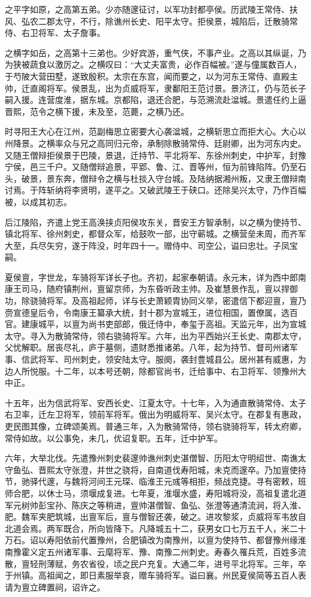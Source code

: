 \documentclass[12pt,UTF8]{ctexbook}
\begin{document}
之平字如原，之高第五弟。少亦随邃征讨，以军功封都亭侯。历武陵王常侍、扶风、弘农二郡太守，不行，除谯州长史、阳平太守。拒侯景，城陷后，迁散骑常侍、右卫将军、太子詹事。

之横字如岳，之高第十三弟也。少好宾游，重气侠，不事产业。之高以其纵诞，乃为狭被蔬食以激厉之。之横叹曰：“大丈夫富贵，必作百幅被。”遂与僮属数百人，于芍陂大营田墅，遂致殷积。太宗在东宫，闻而要之，以为河东王常侍、直殿主帅，迁直阁将军。侯景乱，出为贞威将军，隶鄱阳王范讨景。景济江，仍与范长子嗣入援。连营度淮，据东城。京都陷，退还合肥，与范溯流赴湓城。景遣任约上逼晋熙，范令之横下援，未及至，范薨，之横乃还。

时寻阳王大心在江州，范副梅思立密要大心袭湓城，之横斩思立而拒大心。大心以州降景。之横率众与兄之高同归元帝，承制除散骑常侍、廷尉卿，出为河东内史。又随王僧辩拒侯景于巴陵，景退，迁持节、平北将军、东徐州刺史，中护军，封豫宁侯，邑三千户。又随僧辩追景，平郢、鲁、江、晋等州，恒为前锋陷阵。仍至石头，破景，景东奔，僧辩令之横与杜掞入守台城。及陆纳据湘州叛，又隶王僧辩南讨焉。于阵斩纳将李贤明，遂平之。又破武陵王于硖口。还除吴兴太守，乃作百幅被，以成其初志。

后江陵陷，齐遣上党王高涣挟贞阳侯攻东关，晋安王方智承制，以之横为使持节、镇北将军、徐州刺史，都督众军，给鼓吹一部，出守蕲城。之横营垒未周，而齐军大至，兵尽矢穷，遂于阵没，时年四十一。赠侍中、司空公，谥曰忠壮。子凤宝嗣。

夏侯亶，字世龙，车骑将军详长子也。齐初，起家奉朝请。永元末，详为西中郎南康王司马，随府镇荆州，亶留京师，为东昏听政主帅。及崔慧景作乱，亶以捍御功，除骁骑将军。及高祖起师，详与长史萧颖胄协同义举，密遣信下都迎亶，亶乃赍宣德皇后令，令南康王纂承大统，封十郡为宣城王，进位相国，置僚属，选百官。建康城平，以亶为尚书吏部郎，俄迁侍中，奉玺于高祖。天监元年，出为宣城太守。寻入为散骑常侍，领右骁骑将军。六年，出为平西始兴王长史、南郡太守，父忧解职。居丧尽礼，庐于墓侧，遗财悉推诸弟。八年，起为持节、督司州诸军事、信武将军、司州刺史，领安陆太守。服阕，袭封豊城县公。居州甚有威惠，为边人所悦服。十二年，以本号还朝，除都官尚书，迁给事中、右卫将军、领豫州大中正。

十五年，出为信武将军、安西长史、江夏太守。十七年，入为通直散骑常侍、太子右卫率，迁左卫将军，领前军将军。俄出为明威将军、吴兴太守。在郡复有惠政，吏民图其像，立碑颂美焉。普通三年，入为散骑常侍，领右骁骑将军，转太府卿，常侍如故。以公事免，未几，优诏复职。五年，迁中护军。

六年，大举北伐。先遣豫州刺史裴邃帅谯州刺史湛僧智、历阳太守明绍世、南谯太守鱼弘、晋熙太守张澄，并世之骁将，自南道伐寿阳城，未克而邃卒。乃加亶使持节，驰驿代邃，与魏将河间王元琛、临淮王元彧等相拒，频战克捷。寻有密敕，班师合肥，以休士马，须堰成复进。七年夏，淮堰水盛，寿阳城将没，高祖复遣北道军元树帅彭宝孙、陈庆之等稍进，亶帅湛僧智、鱼弘、张澄等通清流涧，将入淮、肥。魏军夹肥筑城，出亶军后，亶与僧智还袭，破之。进攻黎浆，贞威将军韦放自北道会焉。两军既合，所向皆降下。凡降城五十二，获男女口七万五千人，米二十万石。诏以寿阳依前代置豫州，合肥镇改为南豫州，以亶为使持节、都督豫州缘淮南豫霍义定五州诸军事、云麾将军、豫、南豫二州刺史。寿春久罹兵荒，百姓多流散，亶轻刑薄赋，务农省役，顷之民户充复。大通二年，进号平北将军。三年，卒于州镇。高祖闻之，即日素服举哀，赠车骑将军。谥曰襄。州民夏侯简等五百人表请为亶立碑置祠，诏许之。
\end{document}
